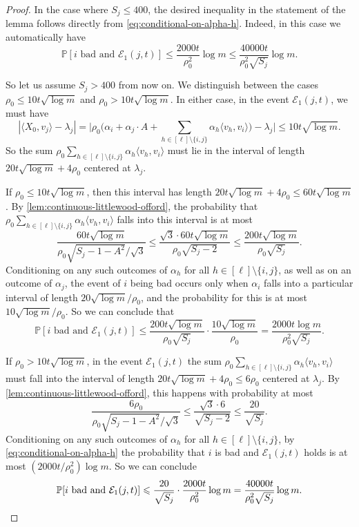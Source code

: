 \documentclass[10pt,a4paper]{amsart}
\newcommand{\ang}[1]{\langle#1\rangle}
\newcommand{\cE}{\mathcal E}
\renewcommand{\P}{\mathbb{P}}
\renewcommand{\le}{\leqslant}
\begin{document}
\begin{proof}
In the case where $S_j\le 400$, the desired inequality in the statement of the lemma follows directly from \eqref{eq:conditional-on-alpha-h}. Indeed, in this case we automatically have
\[\P[i\text{ bad}\text{ and }\cE_1(j,t)]\le  \frac{2000t}{\rho_0^2}\log m\le \frac{40000t}{\rho_0^2\sqrt{S_j}}\log m.\]

So let us assume $S_j > 400$ from  now on. We distinguish between the cases $\rho_0\le 10t\sqrt{\log m}$ and $\rho_0 > 10t\sqrt{\log m}$. In either case, in the event $\cE_1(j,t)$, we must have 
\[|\ang{X_0, v_j} - \lambda_j| = \Big|\rho_0\Big(\alpha_i+\alpha_j\cdot A + \sum_{h\in [\ell]\setminus\{i,j\}}\alpha_h\ang{v_h,v_i} \Big)- \lambda_j\Big| \le 10t\sqrt{\log m}.\]
So the sum $\rho_0\sum_{h\in [\ell]\setminus\{i,j\}}\alpha_h\ang{v_h,v_i}$ must lie in the interval of length $20t\sqrt{\log m}+4\rho_0$ centered at $\lambda_j$.

If $\rho_0\le 10t\sqrt{\log m}$, then this interval has length $20t\sqrt{\log m}+4\rho_0 \le 60t\sqrt{\log m}$. By \cref{lem:continuous-littlewood-offord}, the probability that $\rho_0\sum_{h\in [\ell]\setminus\{i,j\}}\alpha_h\ang{v_h,v_i}$ falls into this interval is at most 
\[\frac{60t\sqrt{\log m}}{\rho_0\sqrt{S_j - 1 - A^2}/\sqrt{3}}\le \frac{\sqrt{3}\cdot 60t\sqrt{\log m}}{\rho_0\sqrt{S_j - 2}}\le \frac{200t\sqrt{\log m}}{\rho_0\sqrt{S_j}}.\]
Conditioning on any such outcomes of $\alpha_h$ for all $h\in [\ell]\setminus\{i,j\}$, as well as on an outcome of $\alpha_j$, the event of $i$ being bad occurs only when $\alpha_i$ falls into a particular interval of length $20\sqrt{\log m}/\rho_0$, and the probability for this is at most $10\sqrt{\log m}/\rho_0$. So we can conclude that 
\[\P[i \text{ bad and }\cE_1(j,t)]\le \frac{200t\sqrt{\log m}}{\rho_0\sqrt{S_j}}\cdot \frac{10\sqrt{\log m}}{\rho_0} = \frac{2000t\log m}{\rho_0^2\sqrt{S_j}}.\]

If $\rho_0 > 10t\sqrt{\log m}$, in the event $\cE_1(j,t)$ the sum $\rho_0\sum_{h\in [\ell]\setminus\{i,j\}}\alpha_h\ang{v_h,v_i}$ must fall into the interval of length $20t\sqrt{\log m}+4\rho_0\le 6\rho_0$ centered at $\lambda_j$. By \cref{lem:continuous-littlewood-offord}, this happens with probability at most
\[\frac{6\rho_0}{\rho_0\sqrt{S_j - 1 - A^2}/\sqrt{3}}\le \frac{\sqrt{3}\cdot 6}{\sqrt{S_j - 2}}\le \frac{20}{\sqrt{S_j}}.\]
Conditioning on any such outcomes of $\alpha_h$ for all $h\in [\ell]\setminus\{i,j\}$, by \eqref{eq:conditional-on-alpha-h} the probability that $i$ is bad and $\cE_1(j,t)$ holds is at most  $(2000t/\rho_0^2)\log m$. So we can conclude 
\[\P[i\text{ bad}\text{ and }\cE_1(j,t)]\le  \frac{20}{\sqrt{S_j}}\cdot\frac{2000t}{\rho_0^2}\log m=\frac{40000t}{\rho_0^2\sqrt{S_j}}\log m. \qedhere\]
\end{proof}
\end{document}
